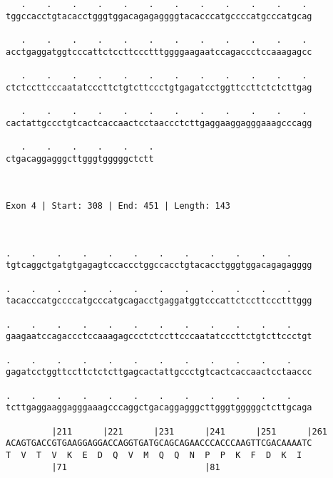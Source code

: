 \documentclass{article}
\begin{document}
\begin{Verbatim}
   .    .    .    .    .    .    .    .    .    .    .    . 
tggccacctgtacacctgggtggacagagaggggtacacccatgccccatgcccatgcag
                                                            
   .    .    .    .    .    .    .    .    .    .    .    . 
acctgaggatggtcccattctccttccctttggggaagaatccagaccctccaaagagcc
                                                            
   .    .    .    .    .    .    .    .    .    .    .    . 
ctctccttcccaatatcccttctgtcttccctgtgagatcctggttccttctctcttgag
                                                            
   .    .    .    .    .    .    .    .    .    .    .    . 
cactattgccctgtcactcaccaactcctaaccctcttgaggaaggagggaaagcccagg
                                                            
   .    .    .    .    .    .
ctgacaggagggcttgggtgggggctctt
                             
                             
 
Exon 4 | Start: 308 | End: 451 | Length: 143



.    .    .    .    .    .    .    .    .    .    .    .    
tgtcaggctgatgtgagagtccaccctggccacctgtacacctgggtggacagagagggg
                                                            
.    .    .    .    .    .    .    .    .    .    .    .    
tacacccatgccccatgcccatgcagacctgaggatggtcccattctccttccctttggg
                                                            
.    .    .    .    .    .    .    .    .    .    .    .    
gaagaatccagaccctccaaagagccctctccttcccaatatcccttctgtcttccctgt
                                                            
.    .    .    .    .    .    .    .    .    .    .    .    
gagatcctggttccttctctcttgagcactattgccctgtcactcaccaactcctaaccc
                                                            
.    .    .    .    .    .    .    .    .    .    .    .    
tcttgaggaaggagggaaagcccaggctgacaggagggcttgggtgggggctcttgcaga
                                                            
         |211      |221      |231      |241      |251      |261
ACAGTGACCGTGAAGGAGGACCAGGTGATGCAGCAGAACCCACCCAAGTTCGACAAAATC
T  V  T  V  K  E  D  Q  V  M  Q  Q  N  P  P  K  F  D  K  I  
         |71                           |81                  
  

\end{Verbatim}
\end{document}
